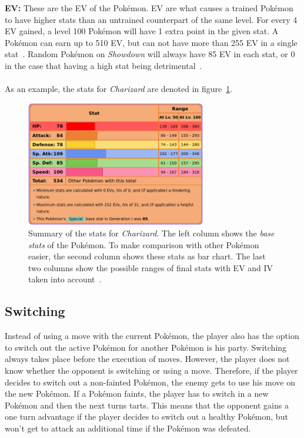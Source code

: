 \textbf{EV:} These are the \ac{EV} of the Pokémon. \ac{EV} are what causes a trained Pokémon to have higher
stats than an untrained counterpart of the same level. For every 4 \ac{EV} gained, a level 100 Pokémon 
will have 1 extra point in the given stat. A Pokémon can earn up to 510 \ac{EV}, but can not have more than
255 \ac{EV} in a single stat~\autocite{Bulbapedia:Stat}. Random Pokémon on \textit{Showdown} will always have 85 
\ac{EV} in each stat, or 0 in the case that having a high stat being detrimental~\autocite{Smogon:RandBatsGuide}.
\\
\\
As an example, the stats for \textit{Charizard} are denoted in figure~\ref{fig:charizard-stats}. 
\begin{figure}[h]
	\centering
	\includegraphics[width=0.7\textwidth]{images/charizard-stats.png}
	\caption{Summary of the stats for \textit{Charizard}. The left column shows the
	\textit{base stats} of the Pokémon. To make comparison with other Pokémon easier, 
	the second column shows these stats as bar chart. The last two columns show the
	possible ranges of final stats with \ac{EV} and \ac{IV} taken into account~\autocite{Bulbapedia:Charizard}.}
	\label{fig:charizard-stats}
\end{figure}

\subsection{Switching}
\label{sec:switching}
Instead of using a move with the current Pokémon, the player also has the option to switch out the 
active Pokémon for another Pokémon is his party. Switching always takes place before the execution of moves.
However, the player does not know whether the opponent is switching or using a move. Therefore, if the 
player decides to switch out a non-fainted Pokémon, the enemy gets to use his move on the new Pokémon.
If a Pokémon faints, the player has to switch in a new Pokémon and then the next turns tarts. This means
that the opponent gains a one turn advantage if the player decides to switch out a healthy Pokémon, but
won't get to attack an additional time if the Pokémon was defeated.  

